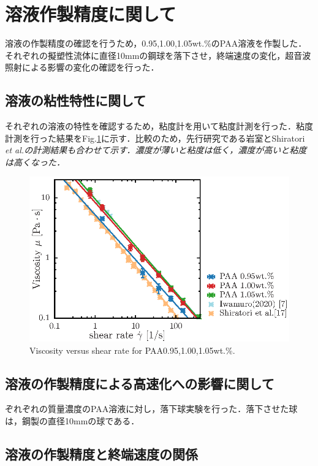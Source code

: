 \section{溶液作製精度に関して}

溶液の作製精度の確認を行うため，0.95,1.00,1.05wt.\%のPAA溶液を作製した．それぞれの擬塑性流体に直径10mmの鋼球を落下させ，終端速度の変化，超音波照射による影響の変化の確認を行った．

\subsection{溶液の粘性特性に関して}
それぞれの溶液の特性を確認するため，粘度計を用いて粘度計測を行った．粘度計測を行った結果をFig.\ref{fig:95-105}に示す．比較のため，先行研究である岩室\cite{ref:8}とShiratori \it{et al}.\cite{ref:9}の計測結果も合わせて示す．濃度が薄いと粘度は低く，濃度が高いと粘度は高くなった．

\begin{figure}[ht]
    \includegraphics[width=1\textwidth]{X-Appendix/concentration/viscosity/viscosity.eps}
    \caption{Viscosity versus shear rate for PAA0.95,1.00,1.05wt.\%.}
    \label{fig:95-105}
\end{figure}

\subsection{溶液の作製精度による高速化への影響に関して}

ぞれぞれの質量濃度のPAA溶液に対し，落下球実験を行った．落下させた球は，鋼製の直径10mmの球である．

\subsection{溶液の作製精度と終端速度の関係}

